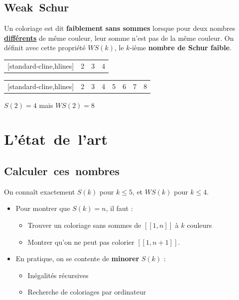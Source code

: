 \documentclass[graphics]{beamer}
\begin{document}
\subsection{Weak~Schur}

\begin{frame}
	\begin{tcolorbox}[colback=red!5,colframe=red!40!black,title=Définition]
		Un coloriage est dit \textbf{faiblement sans sommes} lorsque pour deux nombres \underline{\textbf{différents}} de même couleur,
		leur somme n'est pas de la même couleur. On définit avec cette propriété \(WS(k)\), le \(k\)-ième 
		\textbf{nombre de Schur faible}.
	\end{tcolorbox}
	\pause 
	\begin{center}
	\begin{NiceTabular}{|*{4}{c|}}[standard-cline,hlines]
		\CodeBefore
		 & 2 & 3 & 4 \\
	\end{NiceTabular}

	\begin{NiceTabular}{|*{8}{c|}}[standard-cline,hlines]
		\CodeBefore
		 & 2 & 3 & 4 & 5 & 6 & 7 & 8 \\
	\end{NiceTabular}
	\end{center}
	\(S(2) = 4\) mais \(WS(2) = 8\)
\end{frame}

\section{L'état~de~l'art}
\subsection{Calculer~ces~nombres}

\begin{frame}
	On connaît exactement \(S(k)\) pour \(k \leqslant 5\), et \(WS(k)\) pour \(k \leqslant 4\).
	\pause
	\begin{itemize}
	\item Pour montrer que \(S(k) = n\), il faut : 
	\begin{itemize} 
		\item Trouver un coloriage sans sommes de \([\![1,n]\!]\) à \(k\) couleurs
		\item Montrer qu'on ne peut pas colorier \([\![1,n+1]\!]\). 
	\end{itemize}
	\pause
	\item En pratique, on se contente de \textbf{minorer} \(S(k)\) :
	\begin{itemize}
	\item Inégalités récursives 
	\item Recherche de coloriages par ordinateur
	\end{itemize}
	\end{itemize}
\end{frame}
\end{document}
